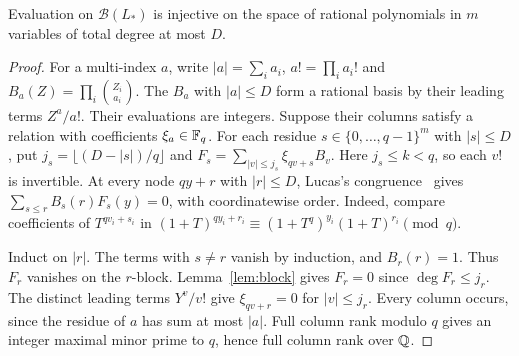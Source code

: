 \begin{proposition}\label{prop:lucas}
Evaluation on \(\mathcal B(L_*)\) is injective on the space of rational
polynomials in \(m\) variables of total degree at most \(D\).
\end{proposition}

\begin{proof}
For a multi-index \(a\), write \(|a|=\sum_i a_i\), \(a!=\prod_i a_i!\)
and \(B_a(Z)=\prod_i\binom{Z_i}{a_i}\).
The \(B_a\) with \(|a|\le D\) form a rational basis by their leading terms
\(Z^a/a!\). Their evaluations are integers. Suppose their columns satisfy
a relation with coefficients \(\xi_a\in\mathbb F_q\). For each residue
\(s\in\{0,\ldots,q-1\}^m\) with \(|s|\le D\), put
\(j_s=\lfloor(D-|s|)/q\rfloor\) and
\(F_s=\sum_{|v|\le j_s}\xi_{qv+s}B_v\).
Here \(j_s\le k<q\), so each \(v!\) is invertible.
At every node \(qy+r\) with \(|r|\le D\), Lucas's congruence~\cite{Lucas} gives
\(\sum_{s\le r} B_s(r)F_s(y)=0\), with coordinatewise order.
Indeed, compare coefficients of \(T^{qv_i+s_i}\) in
\((1+T)^{qy_i+r_i}\equiv(1+T^q)^{y_i}(1+T)^{r_i}\pmod q\).

Induct on \(|r|\). The terms with \(s\ne r\) vanish by induction,
and \(B_r(r)=1\). Thus \(F_r\) vanishes on the \(r\)-block.
Lemma~\ref{lem:block} gives \(F_r=0\) since \(\deg F_r\le j_r\).
The distinct leading terms \(Y^v/v!\) give \(\xi_{qv+r}=0\) for \(|v|\le j_r\).
Every column occurs, since the residue of \(a\) has sum at most \(|a|\).
Full column rank modulo \(q\) gives an integer maximal minor prime to \(q\),
hence full column rank over \(\mathbb Q\).
\end{proof}
